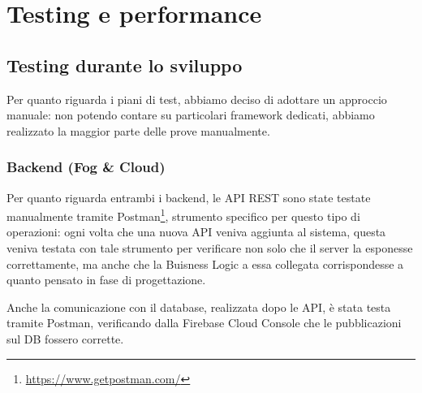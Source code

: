 \section{Testing e performance}





\subsection{Testing durante lo sviluppo}

Per quanto riguarda i piani di test, abbiamo deciso di adottare un approccio manuale:
non potendo contare su particolari framework dedicati, abbiamo realizzato la maggior parte delle prove manualmente.

\subsubsection[Backend]{Backend (Fog \& Cloud)}

Per quanto riguarda entrambi i backend, le API REST sono state testate manualmente tramite Postman\footnote{\url{https://www.getpostman.com/}}, strumento specifico per questo tipo di operazioni:
ogni volta che una nuova API veniva aggiunta al sistema, questa veniva
testata con tale strumento per verificare non solo che il server la esponesse correttamente,
ma anche che la Buisness Logic a essa collegata corrispondesse a quanto pensato in fase di progettazione.

Anche la comunicazione con il database, realizzata dopo le API, è stata testa tramite Postman, verificando dalla Firebase Cloud Console che le pubblicazioni sul DB fossero corrette.

